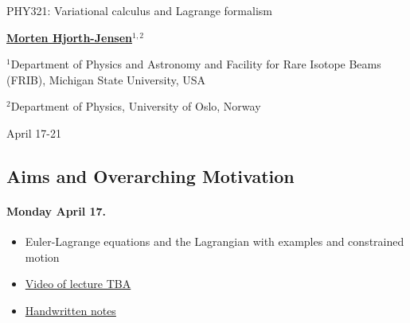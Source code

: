 \documentclass[%
oneside,                 %
final,                   %
10pt]{article}
\begin{document}

\newcommand{\exercisesection}[1]{\subsection*{#1}}






\thispagestyle{empty}

\begin{center}
{\LARGE\bf
\begin{spacing}{1.25}
PHY321: Variational calculus and Lagrange formalism
\end{spacing}
}
\end{center}


\begin{center}
{\bf \href{{http://mhjgit.github.io/info/doc/web/}}{Morten Hjorth-Jensen}${}^{1, 2}$} \\ [0mm]
\end{center}

\begin{center}
\centerline{{\small ${}^1$Department of Physics and Astronomy and Facility for Rare Isotope Beams (FRIB), Michigan State University, USA}}
\centerline{{\small ${}^2$Department of Physics, University of Oslo, Norway}}
\end{center}
    

\begin{center}
April 17-21
\end{center}

\vspace{1cm}


\subsection*{Aims and Overarching Motivation}

\paragraph{Monday April 17.}
\begin{itemize}
\item Euler-Lagrange equations and the Lagrangian with examples and constrained motion

\item \href{{https://youtu.be/}}{Video of lecture TBA}

\item \href{{https://github.com/mhjensen/Physics321/blob/master/doc/HandWrittenNotes/Spring2023/NotesApril17.pdf}}{Handwritten notes}
\end{itemize}
\end{document}
